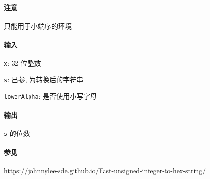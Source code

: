 \paragraph{注意}

只能用于小端序的环境

\paragraph{输入}

\verb|x|: 32 位整数

\verb|s|: 出参, 为转换后的字符串

\verb|lowerAlpha|: 是否使用小写字母

\paragraph{输出}

\verb|s| 的位数

\paragraph{参见}

\url{https://johnnylee-sde.github.io/Fast-unsigned-integer-to-hex-string/}

